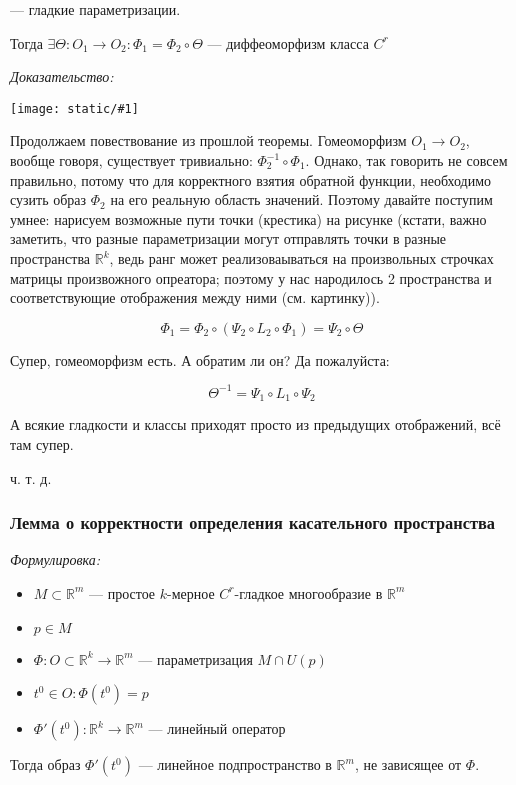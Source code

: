 \documentclass{article}
\def\image#1{\texttt{[image: static/\#1]}}
\begin{document}
--- гладкие параметризации.

Тогда $\exists \Theta: O_1 \rightarrow O_2: \Phi_1 = \Phi_2 \circ \Theta$ --- диффеоморфизм класса $C^r$

\textit{Доказательство:}

\image{sl_o_2_param.png}

Продолжаем повествование из прошлой теоремы. Гомеоморфизм $O_1 \rightarrow O_2$, вообще говоря, существует тривиально: $\Phi_2^{-1} \circ \Phi_1$. Однако, так говорить не совсем правильно, потому что для корректного взятия обратной функции, необходимо сузить образ $\Phi_2$ на его реальную область значений. Поэтому давайте поступим умнее: нарисуем возможные пути точки (крестика) на рисунке (кстати, важно заметить, что разные параметризации могут отправлять точки в разные пространства $\mathbb{R}^k$, ведь ранг может реализоваываться на произвольных строчках матрицы произвожного опреатора; поэтому у нас народилось 2 пространства и соответствующие отображения между ними (см. картинку)).

\[\Phi_1 = \Phi_2 \circ (\Psi_2 \circ L_2 \circ \Phi_1) = \Psi_2 \circ \Theta\]

Супер, гомеоморфизм есть. А обратим ли он? Да пожалуйста:

\[\Theta^{-1} = \Psi_1 \circ L_1 \circ \Psi_2\]

А всякие гладкости и классы приходят просто из предыдущих отображений, всё там супер.

ч. т. д.

\subsubsection{Лемма о корректности определения касательного пространства}
\textit{Формулировка:}

\begin{itemize}
    \item $M \subset \mathbb{R}^m$ --- простое $k$-мерное $C^r$-гладкое многообразие в $\mathbb{R}^m$
    \item $p \in M$
    \item $\Phi: O \subset \mathbb{R}^k \rightarrow \mathbb{R}^m$ --- параметризация $M \cap U(p)$
    \item $t^0 \in O: \Phi(t^0) = p$
    \item $\Phi'(t^0): \mathbb{R}^k \rightarrow \mathbb{R}^m$ --- линейный оператор
\end{itemize}

Тогда образ $\Phi'(t^0)$ --- линейное подпространство в $\mathbb{R}^m$, не зависящее от $\Phi$.
\end{document}
